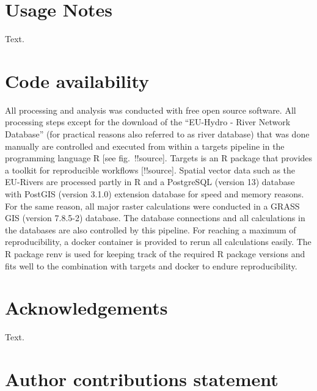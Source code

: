 \documentclass[fleqn,10pt]{wlscirep}
\begin{document}
\hypertarget{usage-notes}{%
\section*{Usage Notes}\label{usage-notes}}

Text.

\hypertarget{code-availability}{%
\section*{Code availability}\label{code-availability}}

All processing and analysis was conducted with free open source software. All processing steps except for the download of the ``EU-Hydro - River Network Database'' (for practical reasons also referred to as river database) that was done manually are controlled and executed from within a targets pipeline in the programming language R {[}see fig.~!!source{]}. Targets is an R package that provides a toolkit for reproducible workflows {[}!!source{]}. Spatial vector data such as the EU-Rivers are processed partly in R and a PostgreSQL (version 13) database with PostGIS (version 3.1.0) extension database for speed and memory reasons. For the same reason, all major raster calculations were conducted in a GRASS GIS (version 7.8.5-2) database. The database connections and all calculations in the databases are also controlled by this pipeline. For reaching a maximum of reproducibility, a docker container is provided to rerun all calculations easily. The R package renv is used for keeping track of the required R package versions and fits well to the combination with targets and docker to endure reproducibility.

\hypertarget{acknowledgements}{%
\section*{Acknowledgements}\label{acknowledgements}}

Text.

\hypertarget{author-contributions-statement}{%
\section*{Author contributions statement}\label{author-contributions-statement}}
\end{document}
